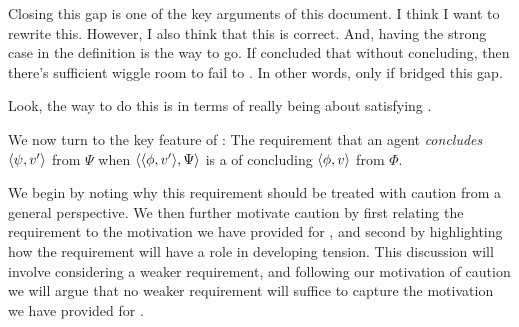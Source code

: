 {
  \color{red}
  Closing this gap is one of the key arguments of this document.
  I think I want to rewrite this.
  However, I also think that this is correct.
  And, having the strong case in the definition is the way to go.
  If concluded that without concluding, then there's sufficient wiggle room to fail to \csV{}.
  In other words, \csN{} only if bridged this gap.

  Look, the way to do this is in terms of \csN{} really being about satisfying \requ{}.

}

\begin{note}
  We now turn to the key feature of \iCS{}:
  The requirement that an agent \emph{concludes} \(\langle \psi, v' \rangle\) from \(\Psi\) when \(\langle \langle \phi, v' \rangle, \Psi \rangle\) is a \requ{} of concluding \(\langle \phi, v \rangle\) from \(\Phi\).

  We begin by noting why this requirement should be treated with caution from a general perspective.
  We then further motivate caution by first relating the requirement to the motivation we have provided for \csN{}, and second by highlighting how the requirement will have a role in developing tension.
  This discussion will involve considering a weaker requirement, and following our motivation of caution we will argue that no weaker requirement will suffice to capture the motivation we have provided for \csN{}.
\end{note}

